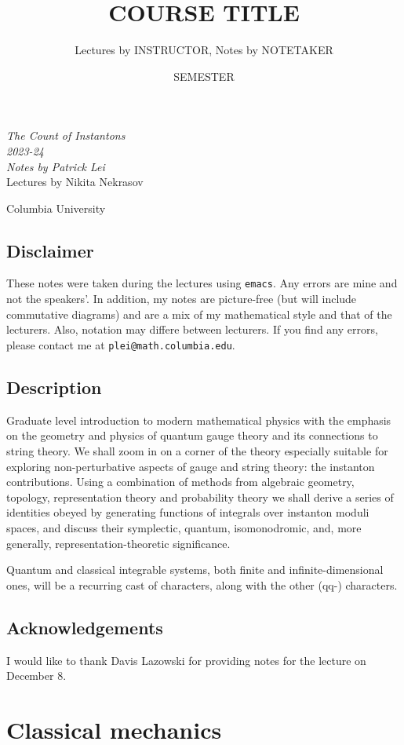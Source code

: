 \documentclass[leqno, openany]{memoir}
\title{COURSE TITLE}
\author{Lectures by INSTRUCTOR, Notes by NOTETAKER}
\date{SEMESTER}
\theoremstyle{definition}
\theoremstyle{remark}
\theoremstyle{plain}
\theoremstyle{definition}
\theoremstyle{remark}
\newcommand*{\titleSW}
    {\begingroup%
    \raggedleft
    \vspace*{\baselineskip}
    {\Huge\itshape The Count of Instantons \\ 2023-24}\\[\baselineskip]
    {\large\itshape Notes by Patrick Lei}\\[0.2\textheight]
    {\Large Lectures by Nikita Nekrasov}\par
    \vfill
    {\Large \sffamily Columbia University}
    \vspace*{\baselineskip}
\endgroup}
\begin{document}
    
\begin{titlingpage}
\titleSW
\end{titlingpage}

\thispagestyle{empty}
\section*{Disclaimer}%
\label{sec:disclaimer}

These notes were taken during the lectures using \texttt{emacs}. 
Any errors are mine and not the speakers'. 
In addition, my notes are picture-free (but will include commutative diagrams) and are a mix of my mathematical style and that of the lecturers. Also, notation may differe between lecturers.
If you find any errors, please contact me at \texttt{plei@math.columbia.edu}.

\section*{Description}

Graduate level introduction to modern mathematical physics with the emphasis on the geometry and physics of quantum gauge theory and its connections to string theory.  We shall zoom in on a corner of the theory especially suitable for exploring non-perturbative aspects of gauge and string theory: the instanton contributions. Using a combination of methods from algebraic geometry, topology, representation theory and probability theory we shall derive a series of identities obeyed by generating functions of integrals over instanton moduli spaces, and discuss their symplectic, quantum, isomonodromic, and, more generally, representation-theoretic significance.

Quantum and classical integrable systems, both finite and infinite-dimensional ones, will be a recurring cast of characters, along with the other (qq-) characters.

\section*{Acknowledgements}
I would like to thank Davis Lazowski for providing notes for the lecture on December 8.


\newpage

\tableofcontents

\chapter{Classical mechanics}
\label{cha:intro}
\end{document}
